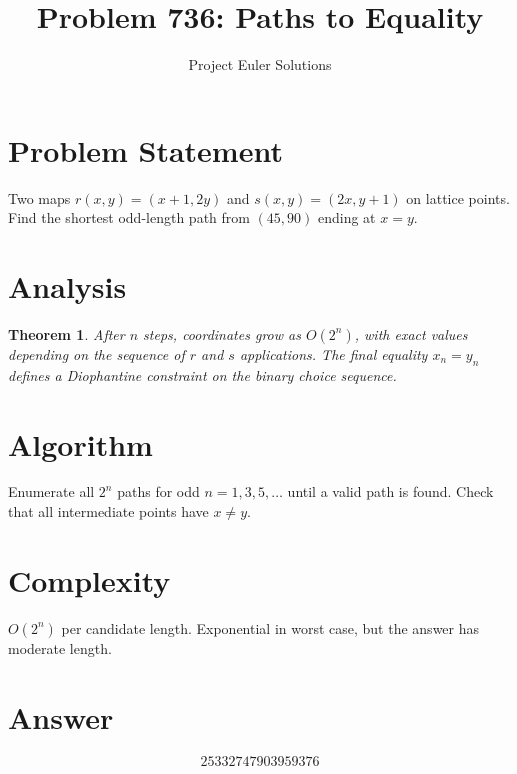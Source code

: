 \documentclass[11pt]{article}
\title{Problem 736: Paths to Equality}
\author{Project Euler Solutions}
\date{}
\newtheorem{theorem}{Theorem}
\begin{document}
\maketitle


\section{Problem Statement}
Two maps $r(x,y) = (x+1,2y)$ and $s(x,y) = (2x,y+1)$ on lattice points. Find the shortest odd-length path from $(45,90)$ ending at $x = y$.

\section{Analysis}

\begin{theorem}
After $n$ steps, coordinates grow as $O(2^n)$, with exact values depending on the sequence of $r$ and $s$ applications. The final equality $x_n = y_n$ defines a Diophantine constraint on the binary choice sequence.
\end{theorem}

\section{Algorithm}
Enumerate all $2^n$ paths for odd $n = 1, 3, 5, \ldots$ until a valid path is found. Check that all intermediate points have $x \ne y$.

\section{Complexity}
$O(2^n)$ per candidate length. Exponential in worst case, but the answer has moderate length.

\section{Answer}

\[
\boxed{25332747903959376}
\]
\end{document}
